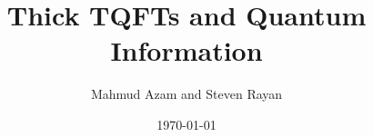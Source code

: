 
\title{Thick TQFTs and Quantum Information}
\author{Mahmud Azam and Steven Rayan}
\date{\today}
\maketitle

